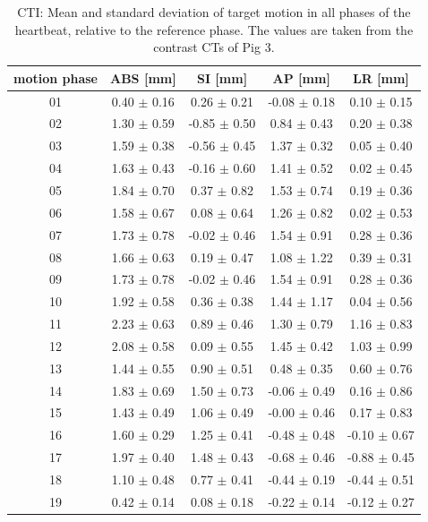 \documentclass[type=dr, dr=rernat, accentcolor=tud7b,colorbacktitle, bigchapter, openright, twoside, 12pt ]{tudthesis}
\begin{document}
\begin{table}[H]
  \centering
  \scriptsize
  \caption{CTI: Mean and standard deviation of target motion in all phases of the heartbeat, relative to the reference phase. The values are 
  taken from the contrast CTs of Pig 3.}
  \begin{tabular}{|c|c|c|c|c|}
    \hline\hline
    motion phase\rule{0pt}{2.6ex}\rule[-1.2ex]{0pt}{0pt} & ABS [mm] & SI [mm] & AP [mm] & LR [mm]\\
    \hline
01 &0.40 $\pm$ 0.16 &0.26 $\pm$ 0.21 &-0.08 $\pm$ 0.18 &0.10 $\pm$ 0.15 \\
02 &1.30 $\pm$ 0.59 &-0.85 $\pm$ 0.50 &0.84 $\pm$ 0.43 &0.20 $\pm$ 0.38 \\
03 &1.59 $\pm$ 0.38 &-0.56 $\pm$ 0.45 &1.37 $\pm$ 0.32 &0.05 $\pm$ 0.40 \\
04 &1.63 $\pm$ 0.43 &-0.16 $\pm$ 0.60 &1.41 $\pm$ 0.52 &0.02 $\pm$ 0.45 \\
05 &1.84 $\pm$ 0.70 &0.37 $\pm$ 0.82 &1.53 $\pm$ 0.74 &0.19 $\pm$ 0.36 \\
06 &1.58 $\pm$ 0.67 &0.08 $\pm$ 0.64 &1.26 $\pm$ 0.82 &0.02 $\pm$ 0.53 \\
07 &1.73 $\pm$ 0.78 &-0.02 $\pm$ 0.46 &1.54 $\pm$ 0.91 &0.28 $\pm$ 0.36 \\
08 &1.66 $\pm$ 0.63 &0.19 $\pm$ 0.47 &1.08 $\pm$ 1.22 &0.39 $\pm$ 0.31 \\
09 &1.73 $\pm$ 0.78 &-0.02 $\pm$ 0.46 &1.54 $\pm$ 0.91 &0.28 $\pm$ 0.36 \\
10 &1.92 $\pm$ 0.58 &0.36 $\pm$ 0.38 &1.44 $\pm$ 1.17 &0.04 $\pm$ 0.56 \\
11 &2.23 $\pm$ 0.63 &0.89 $\pm$ 0.46 &1.30 $\pm$ 0.79 &1.16 $\pm$ 0.83 \\
12 &2.08 $\pm$ 0.58 &0.09 $\pm$ 0.55 &1.45 $\pm$ 0.42 &1.03 $\pm$ 0.99 \\
13 &1.44 $\pm$ 0.55 &0.90 $\pm$ 0.51 &0.48 $\pm$ 0.35 &0.60 $\pm$ 0.76 \\
14 &1.83 $\pm$ 0.69 &1.50 $\pm$ 0.73 &-0.06 $\pm$ 0.49 &0.16 $\pm$ 0.86 \\
15 &1.43 $\pm$ 0.49 &1.06 $\pm$ 0.49 &-0.00 $\pm$ 0.46 &0.17 $\pm$ 0.83 \\
16 &1.60 $\pm$ 0.29 &1.25 $\pm$ 0.41 &-0.48 $\pm$ 0.48 &-0.10 $\pm$ 0.67 \\
17 &1.97 $\pm$ 0.40 &1.48 $\pm$ 0.43 &-0.68 $\pm$ 0.46 &-0.88 $\pm$ 0.45 \\
18 &1.10 $\pm$ 0.48 &0.77 $\pm$ 0.41 &-0.44 $\pm$ 0.19 &-0.44 $\pm$ 0.51 \\
19 &0.42 $\pm$ 0.14 &0.08 $\pm$ 0.18 &-0.22 $\pm$ 0.14 &-0.12 $\pm$ 0.27 \\
    \hline\hline
  \end{tabular}
  \label{tab:motion:CTI:Pig3}
\end{table}
\end{document}
